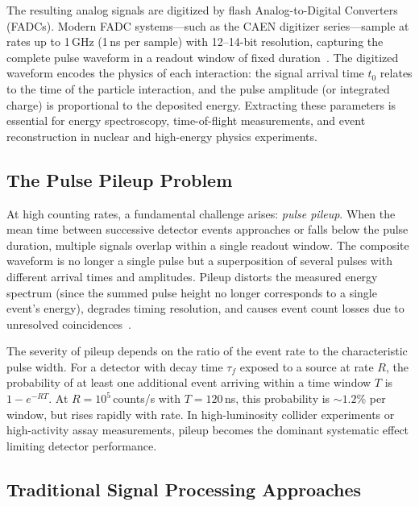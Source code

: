 \documentclass[11pt,twocolumn]{article}
\begin{document}
The resulting analog signals are digitized by flash Analog-to-Digital Converters (FADCs).
Modern FADC systems---such as the CAEN digitizer series---sample at rates up to 1\,GHz (1\,ns per sample) with 12--14-bit resolution, capturing the complete pulse waveform in a readout window of fixed duration~\cite{iaea2013digital}.
The digitized waveform encodes the physics of each interaction: the signal arrival time $t_0$ relates to the time of the particle interaction, and the pulse amplitude (or integrated charge) is proportional to the deposited energy.
Extracting these parameters is essential for energy spectroscopy, time-of-flight measurements, and event reconstruction in nuclear and high-energy physics experiments.

\subsection{The Pulse Pileup Problem}

At high counting rates, a fundamental challenge arises: \emph{pulse pileup}.
When the mean time between successive detector events approaches or falls below the pulse duration, multiple signals overlap within a single readout window.
The composite waveform is no longer a single pulse but a superposition of several pulses with different arrival times and amplitudes.
Pileup distorts the measured energy spectrum (since the summed pulse height no longer corresponds to a single event's energy), degrades timing resolution, and causes event count losses due to unresolved coincidences~\cite{pileup2020correction}.

The severity of pileup depends on the ratio of the event rate to the characteristic pulse width.
For a detector with decay time $\tau_f$ exposed to a source at rate $R$, the probability of at least one additional event arriving within a time window $T$ is $1 - e^{-RT}$.
At $R = 10^5$\,counts/s with $T = 120$\,ns, this probability is ${\sim}1.2\%$ per window, but rises rapidly with rate.
In high-luminosity collider experiments or high-activity assay measurements, pileup becomes the dominant systematic effect limiting detector performance.

\subsection{Traditional Signal Processing Approaches}
\end{document}

